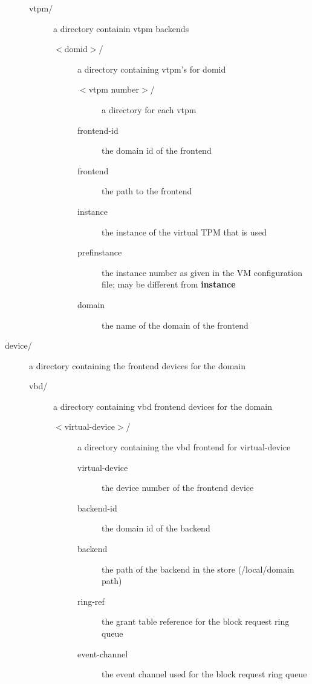\documentclass[11pt,twoside,final,openright]{report}
\begin{document}
\begin{description}
\begin{description}
  \item[vtpm/] a directory containin vtpm backends
    \begin{description}
    \item[$<$domid$>$/] a directory containing vtpm's for domid
      \begin{description}
      \item[$<$vtpm number$>$/] a directory for each vtpm
      \item[frontend-id] the domain id of the frontend
      \item[frontend] the path to the frontend
      \item[instance] the instance of the virtual TPM that is used
      \item[pref{\textunderscore}instance] the instance number as given in the VM configuration file;
           may be different from {\bf instance}
      \item[domain] the name of the domain of the frontend
      \end{description}
    \end{description}

  \end{description}

  \item[device/] a directory containing the frontend devices for the
    domain
    \begin{description}
    \item[vbd/] a directory containing vbd frontend devices for the
      domain
      \begin{description}
      \item[$<$virtual-device$>$/] a directory containing the vbd frontend for
	virtual-device
	\begin{description}
	\item[virtual-device] the device number of the frontend device
	\item[backend-id] the domain id of the backend
	\item[backend] the path of the backend in the store (/local/domain
	  path)
	\item[ring-ref] the grant table reference for the block request
	  ring queue
	\item[event-channel] the event channel used for the block request
	  ring queue
	\end{description}
	

\end{description}
\end{description}
\end{description}
\end{document}
